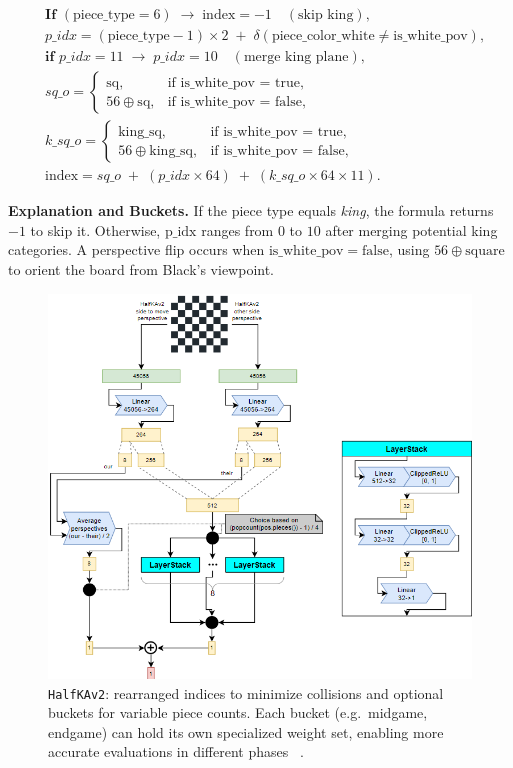 \documentclass[12pt,a4paper]{article}
\begin{document}
\[
\begin{aligned}
&\textbf{If } (\text{piece\_type} = 6) \;\rightarrow\; \text{index} = -1 \quad(\text{skip king}),\\
&p\_idx 
= (\text{piece\_type}-1)\times 2 
  \;+\; 
  \delta(\text{piece\_color\_white} \neq \text{is\_white\_pov}),\\
&\textbf{if } p\_idx=11 
  \;\rightarrow\; 
  p\_idx=10 \quad(\text{merge king plane}),\\
&sq\_o =
\begin{cases}
\text{sq}, & \text{if is\_white\_pov = true},\\
56 \oplus \text{sq}, & \text{if is\_white\_pov = false},
\end{cases}\\
&k\_sq\_o =
\begin{cases}
\text{king\_sq}, & \text{if is\_white\_pov = true},\\
56 \oplus \text{king\_sq}, & \text{if is\_white\_pov = false},
\end{cases}\\
&\text{index} 
= sq\_o 
  \;+\;
  (p\_idx \times 64)
  \;+\;
  (k\_sq\_o \times 64 \times 11).
\end{aligned}
\]

\noindent
\textbf{Explanation and Buckets.}
If the piece type equals \emph{king}, the formula returns \(-1\) to skip it. 
Otherwise, \(\mathrm{p\_idx}\) ranges from \(0\) to \(10\) after merging potential king categories. 
A perspective flip occurs when \(\mathrm{is\_white\_pov} = \text{false}\), using 
\(56 \oplus \text{square}\) to orient the board from Black’s viewpoint. 

\begin{figure}[H]
    \centering
    \includegraphics[width=1\textwidth]{figures/sfnn2.png}
    \caption{\texttt{HalfKAv2}: rearranged indices to minimize collisions 
    and optional buckets for variable piece counts. Each bucket (e.g.\ midgame, endgame)
    can hold its own specialized weight set, enabling more accurate evaluations 
    in different phases ~\cite{githubdocs}.}
    \label{fig:halfkav2}
\end{figure}
\end{document}
